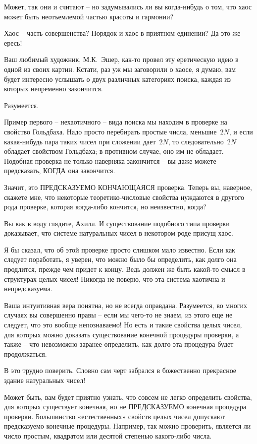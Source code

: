 \documentclass[../main.tex]{subfiles}
\begin{document}
\begin{dialogue}
 Может, так они и считают \--- но задумывались ли вы когда-нибудь о том, что хаос может быть неотъемлемой частью красоты и гармонии?

 Хаос \--- часть совершенства? Порядок и хаос в приятном единении? Да это же ересь!

 Ваш любимый художник, М.К.~Эшер, как-то провел эту еретическую идею в одной из своих картин. Кстати, раз уж мы заговорили о хаосе, я думаю, вам будет интересно услышать о двух различных категориях поиска, каждая из которых непременно закончится.

 Разумеется.

 Пример первого \--- нехаотичного \--- вида поиска мы находим в проверке на свойство Гольдбаха. Надо просто перебирать простые числа, меньшие~$2N$, и если какая-нибудь пара таких чисел при сложении дает~$2N$, то следовательно~$2N$ обладает свойством Гольдбаха; в противном случае, оно им не обладает. Подобная проверка не только наверняка закончится \--- вы даже можете предсказать, КОГДА она закончится.

 Значит, это ПРЕДСКАЗУЕМО КОНЧАЮЩАЯСЯ проверка. Теперь вы, наверное, скажете мне, что некоторые теоретико-числовые свойства нуждаются в другого рода проверке, которая когда-либо кончится, но неизвестно, когда?

 Вы как в воду глядите, Ахилл. И существование подобного типа проверки доказывает, что системе натуральных чисел в некотором роде присущ хаос.

 Я бы сказал, что об этой проверке просто слишком мало известно. Если как следует поработать, я уверен, что можно было бы определить, как долго она продлится, прежде чем придет к концу. Ведь должен же быть какой-то смысл в структурах целых чисел! Никогда не поверю, что эта система хаотична и непредсказуема.

 Ваша интуитивная вера понятна, но не всегда оправдана. Разумеется, во многих случаях вы совершенно правы \--- если мы чего-то не знаем, из этого еще не следует, что это вообще непознаваемо! Но есть и такие свойства целых чисел, для которых можно доказать существование конечной процедуры проверки, а также \--- что невозможно заранее определить, как долго эта процедура будет продолжаться.

 В это трудно поверить. Словно сам черт забрался в божественно прекрасное здание натуральных чисел!

 Может быть, вам будет приятно узнать, что совсем не легко определить свойства, для которых существует конечная, но не ПРЕДСКАЗУЕМО конечная процедура проверки. Большинство «естественных» свойств целых чисел допускают предсказуемо конечные процедуры. Например, так можно проверить, является ли число простым, квадратом или десятой степенью какого-либо числа.


\end{dialogue}
\end{document}
